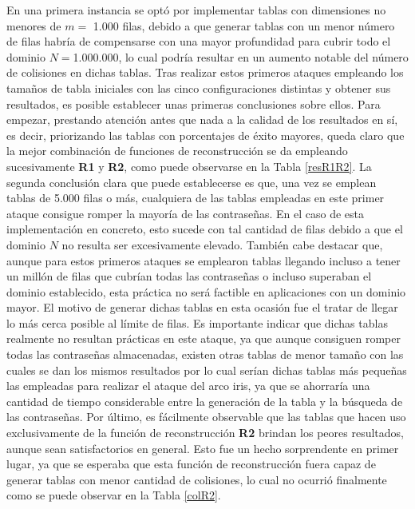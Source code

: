 \documentclass[12pt,spanish,listoffigures,listoftables]{tfgetsinf}
\begin{document}
En una primera instancia se optó por implementar tablas con dimensiones no menores de $m =$ 1.000 filas, debido a que generar tablas con un menor número de filas habría de compensarse con una mayor profundidad para cubrir todo el dominio $N = $1.000.000, lo cual podría resultar en un aumento notable del número de colisiones en dichas tablas. Tras realizar estos primeros ataques empleando los tamaños de tabla iniciales con las cinco configuraciones distintas y obtener sus resultados, es posible establecer unas primeras conclusiones sobre ellos. Para empezar, prestando atención antes que nada a la calidad de los resultados en sí, es decir, priorizando las tablas con porcentajes de éxito mayores, queda claro que la mejor combinación de funciones de reconstrucción se da empleando sucesivamente \textbf{R1} y \textbf{R2}, como puede observarse en la Tabla \ref{resR1R2}. La segunda conclusión clara que puede establecerse es que, una vez se emplean tablas de 5.000 filas o más, cualquiera de las tablas empleadas en este primer ataque consigue romper la mayoría de las contraseñas. En el caso de esta implementación en concreto, esto sucede con tal cantidad de filas debido a que el dominio $N$ no resulta ser excesivamente elevado. También cabe destacar que, aunque para estos primeros ataques se emplearon tablas llegando incluso a tener un millón de filas que cubrían todas las contraseñas o incluso superaban el dominio establecido, esta práctica no será factible en aplicaciones con un dominio mayor. El motivo de generar dichas tablas en esta ocasión fue el tratar de llegar lo más cerca posible al límite de filas. Es importante indicar que dichas tablas realmente no resultan prácticas en este ataque, ya que aunque consiguen romper todas las contraseñas almacenadas, existen otras tablas de menor tamaño con las cuales se dan los mismos resultados por lo cual serían dichas tablas más pequeñas las empleadas para realizar el ataque del arco iris, ya que se ahorraría una cantidad de tiempo considerable entre la generación de la tabla y la búsqueda de las contraseñas. Por último, es fácilmente observable que las tablas que hacen uso exclusivamente de la función de reconstrucción \textbf{R2} brindan los peores resultados, aunque sean satisfactorios en general. Esto fue un hecho sorprendente en primer lugar, ya que se esperaba que esta función de reconstrucción fuera capaz de generar tablas con menor cantidad de colisiones, lo cual no ocurrió finalmente como se puede observar en la Tabla \ref{colR2}.
\end{document}
